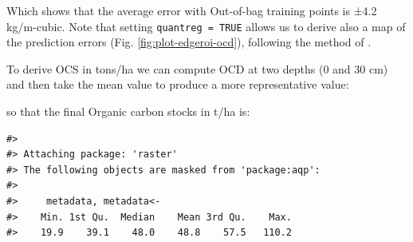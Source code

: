 \documentclass[graybox,natbib,nospthms,UStrade]{svmono}
\newenvironment{Shaded}{\begin{snugshade}}{\end{snugshade}}
\newcommand{\ControlFlowTok}[1]{\textcolor[rgb]{0.27,0.27,0.27}{\textbf{#1}}}
\newcommand{\DataTypeTok}[1]{\textcolor[rgb]{0.27,0.27,0.27}{#1}}
\newcommand{\DecValTok}[1]{\textcolor[rgb]{0.06,0.06,0.06}{#1}}
\newcommand{\FloatTok}[1]{\textcolor[rgb]{0.06,0.06,0.06}{#1}}
\newcommand{\KeywordTok}[1]{\textcolor[rgb]{0.27,0.27,0.27}{\textbf{#1}}}
\newcommand{\NormalTok}[1]{#1}
\newcommand{\OperatorTok}[1]{\textcolor[rgb]{0.43,0.43,0.43}{\textbf{#1}}}
\newcommand{\StringTok}[1]{\textcolor[rgb]{0.5,0.5,0.5}{#1}}
\begin{document}
Which shows that the average error with Out-of-bag training points is ±4.2 kg/m-cubic. Note that setting \texttt{quantreg\ =\ TRUE} allows us to derive also a map of the prediction errors (Fig. \ref{fig:plot-edgeroi-ocd}), following the method of \citet{meinshausen2006quantile}.

To derive OCS in tons/ha we can compute OCD at two depths (0 and 30 cm) and then take the mean value to produce a more representative value:

\begin{Shaded}
\end{Shaded}

so that the final Organic carbon stocks in t/ha is:

\begin{verbatim}
#> 
#> Attaching package: 'raster'
#> The following objects are masked from 'package:aqp':
#> 
#>     metadata, metadata<-
#>    Min. 1st Qu.  Median    Mean 3rd Qu.    Max. 
#>    19.9    39.1    48.0    48.8    57.5   110.2
\end{verbatim}
\end{document}
